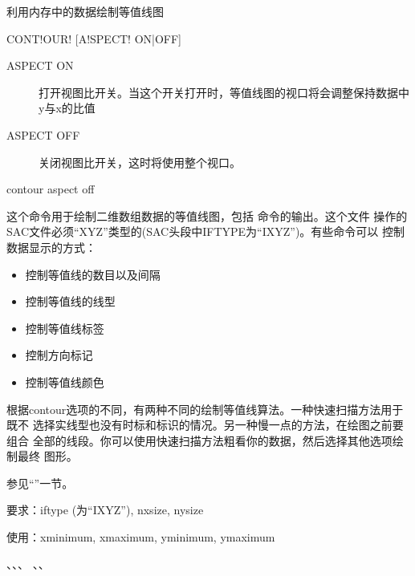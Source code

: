 \label{cmd:contour}

利用内存中的数据绘制等值线图

\begin{SACSTX}
CONT!OUR! [A!SPECT! ON|OFF]
\end{SACSTX}

\begin{description}
\item [ASPECT ON] 打开视图比开关。当这个开关打开时，等值线图的视口将会调整保持数据中y与x的比值
\item [ASPECT OFF] 关闭视图比开关，这时将使用整个视口。
\end{description}

\begin{SACDFT}
contour  aspect  off
\end{SACDFT}

这个命令用于绘制二维数组数据的等值线图，包括 
命令的输出。这个文件
操作的SAC文件必须``XYZ''类型的(SAC头段中IFTYPE为``IXYZ'')。有些命令可以
控制数据显示的方式：
\begin{itemize}
\item {} 控制等值线的数目以及间隔
\item {} 控制等值线的线型
\item {} 控制等值线标签
\item {} 控制方向标记
\item {} 控制等值线颜色
\end{itemize}

根据contour选项的不同，有两种不同的绘制等值线算法。一种快速扫描方法用于既不
选择实线型也没有时标和标识的情况。另一种慢一点的方法，在绘图之前要组合
全部的线段。你可以使用快速扫描方法粗看你的数据，然后选择其他选项绘制最终
图形。

参见``''一节。

要求：iftype (为``IXYZ''), nxsize, nysize

使用：xminimum, xmaximum, yminimum, ymaximum

、、、
、、
